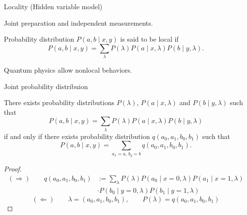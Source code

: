 \documentclass{beamer}
\newcommand\emm[1]{\textcolor{redorange}{{#1}}}
\begin{document}
\begin{frame}{Locality (Hidden variable model)}
\begin{center}
Joint preparation and independent measurements.
\end{center}
Probability distribution $P(a,b\mid x,y)$ is said to be \emm{local} if
\begin{equation*}
P(a, b\mid x,y) = \sum_{\lambda} P(\lambda) P(a\mid x, \lambda) P(b\mid y,\lambda).
\end{equation*}
\vspace{2em}
\begin{center}
Quantum physics allow \emm{nonlocal} behaviors.
\end{center}
\end{frame}

\begin{frame}{Joint probability distribuion}
\small
\begin{lemma}
There exists probability distributions $P(\lambda)$, $P(a\mid x,\lambda)$ and $P(b\mid y,\lambda)$ such that
\begin{equation*}
P(a, b\mid x,y) = \sum_{\lambda} P(\lambda) P(a\mid x, \lambda) P(b\mid y,\lambda)
\end{equation*}
if and only if there exists probability distribution $q(a_0,a_1,b_0,b_1)$ such that
\begin{equation*}
P(a, b\mid x,y) = \sum_{a_x = a,\, b_y = b} q(a_0, a_1, b_0, b_1).
\end{equation*}
\end{lemma}

\vspace{-2em}
\begin{proof}
\begin{align*}
(\Rightarrow)\qquad
q(a_0,a_1,b_0,b_1) &:= \sum_{\lambda}P(\lambda) P(a_0\mid x=0, \lambda) P(a_1\mid x=1, \lambda)\\
&\cdot P(b_0\mid y=0, \lambda) P(b_1\mid y=1, \lambda)
\end{align*}
\begin{equation*}
(\Leftarrow)\qquad
\lambda = (a_0, a_1, b_0, b_1), \qquad P(\lambda) = q(a_0,a_1,b_0,b_1)
\end{equation*}
\end{proof}
\end{frame}
\end{document}
